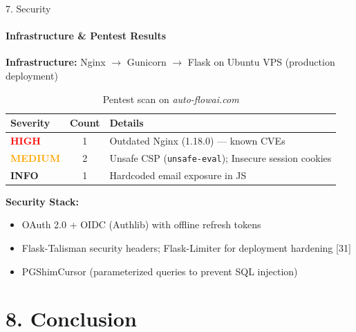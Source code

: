 \documentclass[10pt]{beamer}
\begin{document}
\begin{frame}{7. Security}
    \framesubtitle{Infrastructure \& Pentest Results}
    \textbf{Infrastructure:} Nginx $\rightarrow$ Gunicorn $\rightarrow$ Flask on Ubuntu VPS (production deployment)
    \vspace{0.3cm}
    \begin{table}
        \centering
        \small
        \begin{tabular}{lcl}
            \toprule
            \textbf{Severity} & \textbf{Count} & \textbf{Details} \\
            \midrule
            \textcolor{red}{\textbf{HIGH}}     & 1 & Outdated Nginx (1.18.0) --- known CVEs \\
            \textcolor{orange}{\textbf{MEDIUM}} & 2 & Unsafe CSP (\texttt{unsafe-eval}); Insecure session cookies \\
            \textbf{INFO}                       & 1 & Hardcoded email exposure in JS \\
            \bottomrule
        \end{tabular}
        \caption{Pentest scan on \textit{auto-flowai.com}}
    \end{table}
    \vspace{0.2cm}
    \textbf{Security Stack:}
    \begin{itemize}
        \item OAuth 2.0 + OIDC (Authlib) with offline refresh tokens
        \item Flask-Talisman security headers; Flask-Limiter for deployment hardening [31]
        \item PGShimCursor (parameterized queries to prevent SQL injection)
    \end{itemize}
\end{frame}

\section{8. Conclusion}
\end{document}
